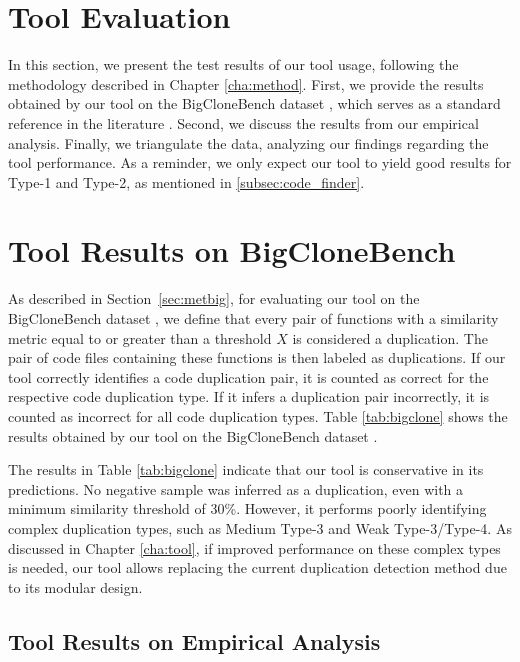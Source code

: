 \section{Tool Evaluation}
\label{sec:eval}

In this section, we present the test results of our tool usage, following the 
methodology described in Chapter \ref{cha:method}. First, we provide the results 
obtained by our tool on the BigCloneBench dataset \citep{bigclonebench}, which 
serves as a standard reference in the literature \citep{litreview}. Second, we 
discuss the results from our empirical analysis. Finally, we triangulate the data, 
analyzing our findings regarding the tool performance. 
As a reminder, we only expect our tool to yield good results for Type-1 and Type-2,
as mentioned in \ref{subsec:code_finder}.

\section{Tool Results on BigCloneBench}



As described in Section~\ref{sec:metbig}, for evaluating our tool on the BigCloneBench dataset \citep{bigclonebench}, we define 
that every pair of functions with a similarity metric equal to or greater than a threshold \( X \) is considered a duplication. 
The pair of code files containing these functions is then labeled as duplications. If our tool correctly 
identifies a code duplication pair, it is counted as correct for the respective code duplication type. If it infers a 
duplication pair incorrectly, it is counted as incorrect for all code duplication types. Table \ref{tab:bigclone} shows the results obtained by our tool on the BigCloneBench dataset \citep{bigclonebench}.

The results in Table \ref{tab:bigclone} indicate that our tool is conservative in its predictions. No negative sample was inferred as a duplication, even with a minimum similarity threshold of 30\%. However, it performs poorly identifying complex duplication types, such as Medium Type-3 and Weak Type-3/Type-4. As discussed in Chapter \ref{cha:tool}, if improved performance on these complex types is needed, our tool allows replacing the current duplication detection method due to its modular design.

\subsection{Tool Results on Empirical Analysis}

